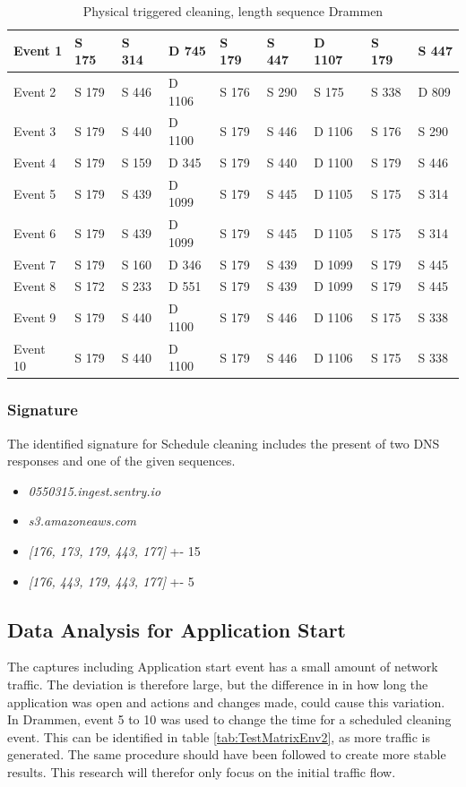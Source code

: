 \begin{table}[H]
\centering
\caption{Physical triggered cleaning, length sequence Drammen}
\label{tab:PCSequenceDrammen}
\begin{tabular}{|l|l|l|l|l|l|l|l|l|}
\hline
Event 1  & S 175 & S 314 & D 745  & S 179 & S 447 & D 1107 & S 179 & S 447 \\ \hline
Event 2  & S 179 & S 446 & D 1106 & S 176 & S 290 & S 175  & S 338 & D 809 \\ \hline
Event 3  & S 179 & S 440 & D 1100 & S 179 & S 446 & D 1106 & S 176 & S 290 \\ \hline
Event 4  & S 179 & S 159 & D 345  & S 179 & S 440 & D 1100 & S 179 & S 446 \\ \hline
Event 5  & S 179 & S 439 & D 1099 & S 179 & S 445 & D 1105 & S 175 & S 314 \\ \hline
Event 6  & S 179 & S 439 & D 1099 & S 179 & S 445 & D 1105 & S 175 & S 314 \\ \hline
Event 7  & S 179 & S 160 & D 346  & S 179 & S 439 & D 1099 & S 179 & S 445 \\ \hline
Event 8  & S 172 & S 233 & D 551  & S 179 & S 439 & D 1099 & S 179 & S 445 \\ \hline
Event 9  & S 179 & S 440 & D 1100 & S 179 & S 446 & D 1106 & S 175 & S 338 \\ \hline
Event 10 & S 179 & S 440 & D 1100 & S 179 & S 446 & D 1106 & S 175 & S 338 \\ \hline
\end{tabular}
\end{table}

\subsubsection{Signature}
The identified signature for Schedule cleaning includes the present of two DNS responses and one of the given sequences.  

\begin{itemize}
    \item \textit{0550315.ingest.sentry.io}
    \item \textit{s3.amazoneaws.com}
    \item \textit{[176, 173, 179, 443, 177]} +- 15
    \item \textit{[176, 443, 179, 443, 177]} +- 5
\end{itemize}

\subsection{Data Analysis for Application Start}
The captures including Application start event has a small amount of network traffic. The deviation is therefore large, but the difference in in how long the application was open and actions and changes made, could cause this variation. In Drammen, event 5 to 10 was used to change the time for a scheduled cleaning event. This can be identified in table \ref{tab:TestMatrixEnv2}, as more traffic is generated. The same procedure should have been followed to create more stable results. This research will therefor only focus on the initial traffic flow.

